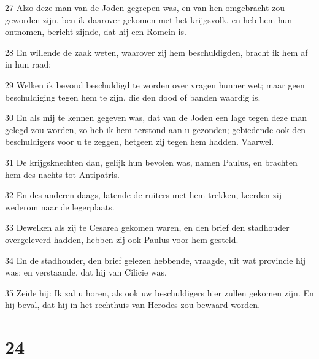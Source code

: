 \par 27 Alzo deze man van de Joden gegrepen was, en van hen omgebracht zou geworden zijn, ben ik daarover gekomen met het krijgsvolk, en heb hem hun ontnomen, bericht zijnde, dat hij een Romein is.
\par 28 En willende de zaak weten, waarover zij hem beschuldigden, bracht ik hem af in hun raad;
\par 29 Welken ik bevond beschuldigd te worden over vragen hunner wet; maar geen beschuldiging tegen hem te zijn, die den dood of banden waardig is.
\par 30 En als mij te kennen gegeven was, dat van de Joden een lage tegen deze man gelegd zou worden, zo heb ik hem terstond aan u gezonden; gebiedende ook den beschuldigers voor u te zeggen, hetgeen zij tegen hem hadden. Vaarwel.
\par 31 De krijgsknechten dan, gelijk hun bevolen was, namen Paulus, en brachten hem des nachts tot Antipatris.
\par 32 En des anderen daags, latende de ruiters met hem trekken, keerden zij wederom naar de legerplaats.
\par 33 Dewelken als zij te Cesarea gekomen waren, en den brief den stadhouder overgeleverd hadden, hebben zij ook Paulus voor hem gesteld.
\par 34 En de stadhouder, den brief gelezen hebbende, vraagde, uit wat provincie hij was; en verstaande, dat hij van Cilicie was,
\par 35 Zeide hij: Ik zal u horen, als ook uw beschuldigers hier zullen gekomen zijn. En hij beval, dat hij in het rechthuis van Herodes zou bewaard worden.

\chapter{24}


